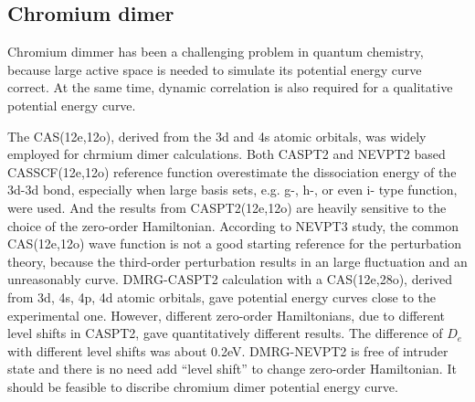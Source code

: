 \subsection{Chromium dimer}

Chromium dimmer has been a challenging problem in quantum chemistry, because large active space is needed to simulate its potential energy curve correct. At the same time, dynamic correlation is also required for a qualitative potential energy curve. \cite{andersson_cr2_1994,roos_multiconfigurational_1995,roos_multiconfigurational_1996,roos_ground_2003,angeli_third-order_2006,muller_large-scale_2009,kurashige_second-order_2011,sharma_multireference_2015}

The CAS(12e,12o), derived from the 3d and 4s atomic orbitals, was widely employed for chrmium dimer calculations.\cite{andersson_cr2_1994,roos_multiconfigurational_1995,roos_multiconfigurational_1996,angeli_third-order_2006,muller_large-scale_2009,sharma_multireference_2015} Both CASPT2\cite{andersson_cr2_1994,roos_multiconfigurational_1995,roos_multiconfigurational_1996} and NEVPT2\cite{angeli_n-electron_2001} based CASSCF(12e,12o) reference function overestimate the dissociation energy of the 3d-3d bond, especially when large basis sets, e.g. g-, h-, or even i- type function, were used.\cite{celani_cipt2_2004,angeli_third-order_2006} And the results from CASPT2(12e,12o) are heavily sensitive to the choice of the zero-order Hamiltonian.\cite{celani_cipt2_2004,ruiperez_complete_2011}
According to NEVPT3 study,\cite{angeli_third-order_2006} the common CAS(12e,12o) wave function is not a good starting reference for the perturbation theory, because the third-order perturbation results in an large fluctuation and an unreasonably curve. DMRG-CASPT2 calculation with a CAS(12e,28o), derived from 3d, 4s, 4p, 4d atomic orbitals, gave potential energy curves close to the experimental one. However, different zero-order Hamiltonians, due to different level shifts in CASPT2, gave quantitatively different results. The difference of $D_e$ with different level shifts was about 0.2eV.
\cite{kurashige_second-order_2011}
DMRG-NEVPT2 is free of intruder state and there is no need add ``level shift'' to change zero-order Hamiltonian. It should be feasible to discribe chromium dimer potential energy curve.

